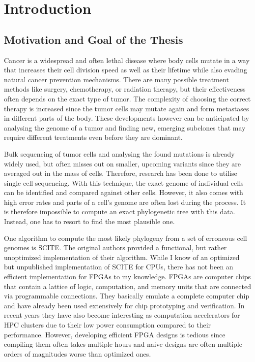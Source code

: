 \chapter{Introduction}
\label{ch:introduction}

\section{Motivation and Goal of the Thesis}

Cancer is a widespread and often lethal disease\cite{10.1001/jamaoncol.2021.6987} where body cells mutate in a way that increases their cell division speed as well as their lifetime while also evading natural cancer prevention mechanisms. There are many possible treatment methods like surgery, chemotherapy, or radiation therapy, but their effectiveness often depends on the exact type of tumor. The complexity of choosing the correct therapy is increased since the tumor cells may mutate again and form metastases in different parts of the body. These developments however can be anticipated by analysing the genome of a tumor and finding new, emerging subclones that may require different treatments even before they are dominant.

Bulk sequencing of tumor cells and analysing the found mutations is already widely used, but often misses out on smaller, upcoming variants since they are averaged out in the mass of cells. Therefore, research has been done to utilise single cell sequencing. With this technique, the exact genome of individual cells can be identified and compared against other cells. However, it also comes with high error rates and parts of a cell's genome are often lost during the process. It is therefore impossible to compute an exact phylogenetic tree with this data. Instead, one has to resort to find the most plausible one.

One algorithm to compute the most likely phylogeny from a set of erroneous cell genomes is \ac{SCITE}\cite{tree2016}. The original authors provided a functional, but rather unoptimized implementation of their algorithm. While I know of an optimized but unpublished implementation of \ac{SCITE} for CPUs, there has not been an efficient implementation for \acp{FPGA} to my knowledge. \acp{FPGA} are computer chips that contain a lattice of logic, computation, and memory units that are connected via programmable connections. They basically emulate a complete computer chip and have already been used extensively for chip prototyping and verification. In recent years they have also become interesting as computation accelerators for \ac{HPC} clusters due to their low power consumption compared to their performance. However, developing efficient \ac{FPGA} designs is tedious since compiling them often takes multiple hours and naive designs are often multiple orders of magnitudes worse than optimized ones. 

